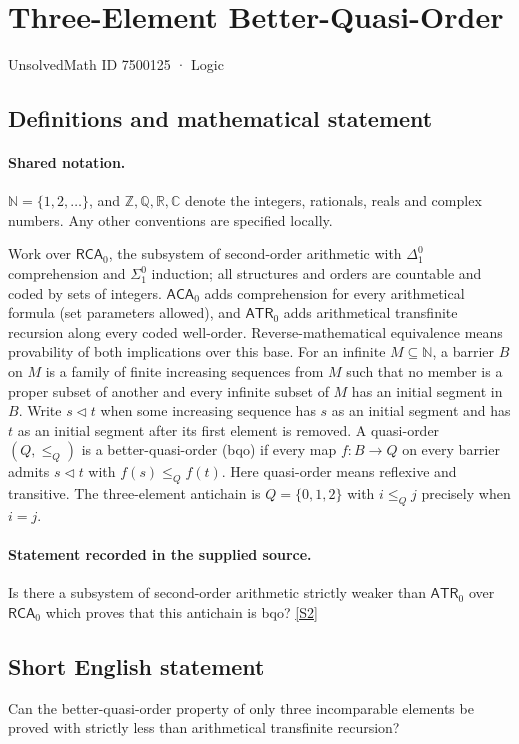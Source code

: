 \documentclass[11pt]{article}
\newcommand{\sref}[2]{\hyperlink{source:#1:#2}{[S#2]}}
\begin{document}
\setcounter{section}{7500124}
\section{Three-Element Better-Quasi-Order}\label{7500125}
{\small\sffamily UnsolvedMath ID 7500125 · Logic}
\subsection{Definitions and mathematical statement}

\paragraph{Shared notation.}$\mathbb N=\{1,2,\ldots\}$, and $\mathbb Z,\mathbb Q,\mathbb R,\mathbb C$ denote the integers, rationals, reals and complex numbers. Any other conventions are specified locally.


Work over $\mathsf{RCA}_0$, the subsystem of second-order arithmetic with $\Delta^0_1$ comprehension and $\Sigma^0_1$ induction; all structures and orders are countable and coded by sets of integers. $\mathsf{ACA}_0$ adds comprehension for every arithmetical formula (set parameters allowed), and $\mathsf{ATR}_0$ adds arithmetical transfinite recursion along every coded well-order. Reverse-mathematical equivalence means provability of both implications over this base. For an infinite $M\subseteq\mathbb N$, a barrier $B$ on $M$ is a family of finite increasing sequences from $M$ such that no member is a proper subset of another and every infinite subset of $M$ has an initial segment in $B$. Write $s\triangleleft t$ when some increasing sequence has $s$ as an initial segment and has $t$ as an initial segment after its first element is removed. A quasi-order $(Q,\le_Q)$ is a better-quasi-order (bqo) if every map $f:B\to Q$ on every barrier admits $s\triangleleft t$ with $f(s)\le_Q f(t)$. Here quasi-order means reflexive and transitive. The three-element antichain is $Q=\{0,1,2\}$ with $i\le_Q j$ precisely when $i=j$.
\paragraph{Statement recorded in the supplied source.}
Is there a subsystem of second-order arithmetic strictly weaker than $\mathsf{ATR}_0$ over $\mathsf{RCA}_0$ which proves that this antichain is bqo? \sref{7500125}{2}
\subsection{Short English statement}
Can the better-quasi-order property of only three incomparable elements be proved with strictly less than arithmetical transfinite recursion?
\end{document}
